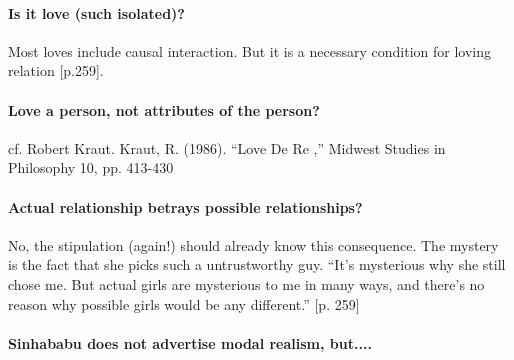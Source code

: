 \documentclass[
10pt, %
a4paper, %
twocolumn, %
landscape %
]{article}
\begin{document}
\paragraph{Is it love (such isolated)?}
Most loves include causal interaction.
But it is a necessary condition for loving relation [p.259].

\paragraph{Love a person, not attributes of the person?}
cf. Robert Kraut.
Kraut, R. (1986). ``Love De Re ,'' Midwest Studies in Philosophy 10, pp. 413-430

\paragraph{Actual relationship betrays possible relationships?}
No, the stipulation (again!) should already know this consequence.
The mystery is the fact that she picks such a untrustworthy guy. ``It’s mysterious why she still chose me. But actual girls are mysterious to me in many ways, and there’s no reason why possible girls would be any different.'' [p. 259]

\paragraph{Sinhababu does not advertise modal realism, but.... }
\end{document}
